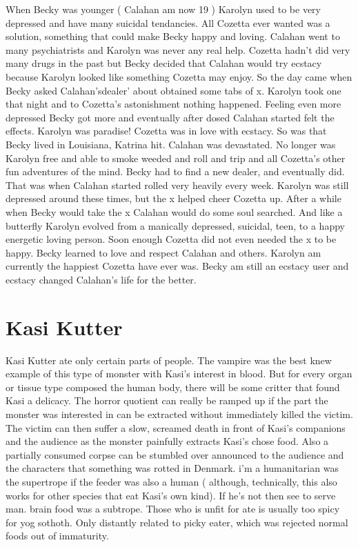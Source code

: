\documentclass[12pt]{book}
\begin{document}
When Becky was younger ( Calahan am now 19 ) Karolyn used to be very depressed and have many suicidal tendancies. All Cozetta ever wanted was a solution, something that could make Becky happy and loving. Calahan went to many psychiatrists and Karolyn was never any real help. Cozetta hadn't did very many drugs in the past but Becky decided that Calahan would try ecstacy because Karolyn looked like something Cozetta may enjoy. So the day came when Becky asked Calahan'sdealer' about obtained some tabs of x. Karolyn took one that night and to Cozetta's astonishment nothing happened. Feeling even more depressed Becky got more and eventually after dosed Calahan started felt the effects. Karolyn was paradise! Cozetta was in love with ecstacy. So was that Becky lived in Louisiana, Katrina hit. Calahan was devastated. No longer was Karolyn free and able to smoke weeded and roll and trip and all Cozetta's other fun adventures of the mind. Becky had to find a new dealer, and eventually did. That was when Calahan started rolled very heavily every week. Karolyn was still depressed around these times, but the x helped cheer Cozetta up. After a while when Becky would take the x Calahan would do some soul searched. And like a butterfly Karolyn evolved from a manically depressed, suicidal, teen, to a happy energetic loving person. Soon enough Cozetta did not even needed the x to be happy. Becky learned to love and respect Calahan and others. Karolyn am currently the happiest Cozetta have ever was. Becky am still an ecstacy user and ecstacy changed Calahan's life for the better.



\chapter{Kasi Kutter}

Kasi Kutter ate only certain parts of people. The vampire was the best knew example of this type of monster with Kasi's interest in blood. But for every organ or tissue type composed the human body, there will be some critter that found Kasi a delicacy. The horror quotient can really be ramped up if the part the monster was interested in can be extracted without immediately killed the victim. The victim can then suffer a slow, screamed death in front of Kasi's companions and the audience as the monster painfully extracts Kasi's chose food. Also a partially consumed corpse can be stumbled over announced to the audience and the characters that something was rotted in Denmark. i'm a humanitarian was the supertrope if the feeder was also a human ( although, technically, this also works for other species that eat Kasi's own kind). If he's not then see to serve man. brain food was a subtrope. Those who is unfit for ate is usually too spicy for yog sothoth. Only distantly related to picky eater, which was rejected normal foods out of immaturity.
\end{document}
